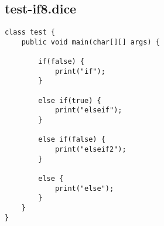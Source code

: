 \subsection{test-if8.dice}
\begin{verbatim}
class test {
	public void main(char[][] args) {

		if(false) { 
			print("if");
		} 
		
		else if(true) { 
			print("elseif"); 
		}

		else if(false) {
			print("elseif2");
		}

		else {
			print("else");
		}
	}
}
\end{verbatim}